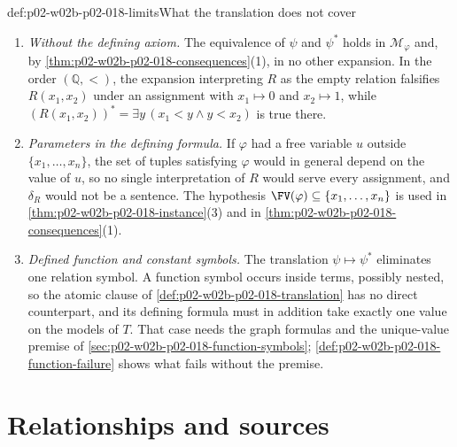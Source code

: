 \begin{hbwarning}{def:p02-w02b-p02-018-limits}{What the translation does not cover}
\begin{enumerate}
 \item \emph{Without the defining axiom.}  The equivalence of \(\psi\) and
       \(\psi^{*}\) holds in \(\mathcal M_{\varphi}\) and, by
       \cref{thm:p02-w02b-p02-018-consequences}(1), in no other expansion.
       In the order \((\mathbb Q,<)\), the expansion interpreting \(R\) as
       the empty relation falsifies \(R(x_1,x_2)\) under an assignment with
       \(x_1\mapsto0\) and \(x_2\mapsto1\), while
       \((R(x_1,x_2))^{*}=\exists y\,(x_1<y\land y<x_2)\) is true there.
 \item \emph{Parameters in the defining formula.}  If \(\varphi\) had a
       free variable \(u\) outside \(\{x_1,\ldots,x_n\}\), the set of tuples
       satisfying \(\varphi\) would in general depend on the value of
       \(u\), so no single interpretation of \(R\) would serve every
       assignment, and \(\delta_R\) would not be a sentence.  The hypothesis
       \(\FV(\varphi)\subseteq\{x_1,\ldots,x_n\}\) is used in
       \cref{thm:p02-w02b-p02-018-instance}(3) and in
       \cref{thm:p02-w02b-p02-018-consequences}(1).
 \item \emph{Defined function and constant symbols.}  The translation
       \(\psi\mapsto\psi^{*}\) eliminates one relation symbol.  A function
       symbol occurs inside terms, possibly nested, so the atomic clause of
       \cref{def:p02-w02b-p02-018-translation} has no direct counterpart,
       and its defining formula must in addition take exactly one value on
       the models of \(T\).  That case needs the graph formulas and the
       unique-value premise of \cref{sec:p02-w02b-p02-018-function-symbols};
       \cref{def:p02-w02b-p02-018-function-failure} shows what fails without
       the premise.
\end{enumerate}
\end{hbwarning}

\section{Relationships and sources}
\label{sec:p02-w02b-p02-018-relationships}

